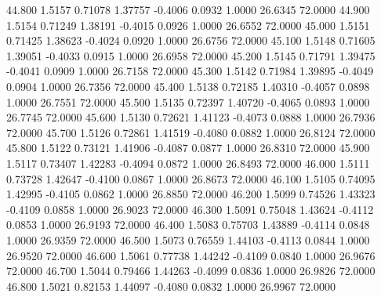   44.800   1.5157   0.71078   1.37757  -0.4006   0.0932   1.0000  26.6345  72.0000
  44.900   1.5154   0.71249   1.38191  -0.4015   0.0926   1.0000  26.6552  72.0000
  45.000   1.5151   0.71425   1.38623  -0.4024   0.0920   1.0000  26.6756  72.0000
  45.100   1.5148   0.71605   1.39051  -0.4033   0.0915   1.0000  26.6958  72.0000
  45.200   1.5145   0.71791   1.39475  -0.4041   0.0909   1.0000  26.7158  72.0000
  45.300   1.5142   0.71984   1.39895  -0.4049   0.0904   1.0000  26.7356  72.0000
  45.400   1.5138   0.72185   1.40310  -0.4057   0.0898   1.0000  26.7551  72.0000
  45.500   1.5135   0.72397   1.40720  -0.4065   0.0893   1.0000  26.7745  72.0000
  45.600   1.5130   0.72621   1.41123  -0.4073   0.0888   1.0000  26.7936  72.0000
  45.700   1.5126   0.72861   1.41519  -0.4080   0.0882   1.0000  26.8124  72.0000
  45.800   1.5122   0.73121   1.41906  -0.4087   0.0877   1.0000  26.8310  72.0000
  45.900   1.5117   0.73407   1.42283  -0.4094   0.0872   1.0000  26.8493  72.0000
  46.000   1.5111   0.73728   1.42647  -0.4100   0.0867   1.0000  26.8673  72.0000
  46.100   1.5105   0.74095   1.42995  -0.4105   0.0862   1.0000  26.8850  72.0000
  46.200   1.5099   0.74526   1.43323  -0.4109   0.0858   1.0000  26.9023  72.0000
  46.300   1.5091   0.75048   1.43624  -0.4112   0.0853   1.0000  26.9193  72.0000
  46.400   1.5083   0.75703   1.43889  -0.4114   0.0848   1.0000  26.9359  72.0000
  46.500   1.5073   0.76559   1.44103  -0.4113   0.0844   1.0000  26.9520  72.0000
  46.600   1.5061   0.77738   1.44242  -0.4109   0.0840   1.0000  26.9676  72.0000
  46.700   1.5044   0.79466   1.44263  -0.4099   0.0836   1.0000  26.9826  72.0000
  46.800   1.5021   0.82153   1.44097  -0.4080   0.0832   1.0000  26.9967  72.0000
